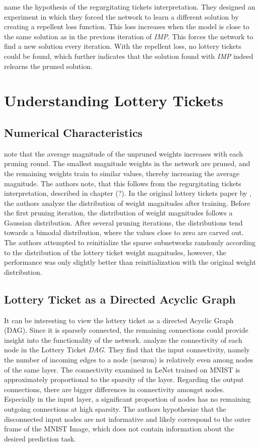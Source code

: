 \textcite{maene_towards_2021} name the hypothesis of \autocite{WhyLotteryTicketsWin} the regurgitating tickets interpretation.
They designed an experiment in which they forced the network to learn a different solution by creating a repellent loss function.
This loss increases when the model is close to the same solution as in the previous iteration of \textit{IMP}.
This forces the network to find a new solution every iteration.
With the repellent loss, no lottery tickets could be found, which further indicates that the solution found with \textit{IMP} indeed relearns the pruned solution.

\section{Understanding Lottery Tickets}
\subsection{Numerical Characteristics}
\autocite{maene_towards_2021} note that the average magnitude of the unpruned weights increases with each pruning round. The smallest magnitude weights in the network are pruned, and the remaining weights train to similar values, thereby increasing the average magnitude. The authors note, that this follows from the regurgitating tickets interpretation, described in chapter (?).
In the original lottery tickets paper by \textcite{LTH}, the authors analyze the distribution of weight magnitudes after training. Before the first pruning iteration, the distribution of weight magnitudes follows a Gaussian distribution. After several pruning iterations, the distributions tend towards a bimodal distribution, where the values close to zero are carved out.
The authors attempted to reinitialize the sparse subnetworks randomly according to the distribution of the lottery ticket weight magnitudes, however, the performance was only slightly better than reinitialization with the original weight distribution.

\subsection{Lottery Ticket as a Directed Acyclic Graph}
It can be interesting to view the lottery ticket as a directed Acyclic Graph (DAG).
Since it is sparsely connected, the remaining connections could provide insight into the functionality of the network.
\textcite{LTH} analyze the connectivity of each node in the Lottery Ticket \textit{DAG}.
They find that the input connectivity, namely the number of incoming edges to a node (neuron) is relatively even among nodes of the same layer.
The connectivity examined in LeNet trained on MNIST is approximately proportional to the sparsity of the layer.
Regarding the output connections, there are bigger differences in connectivity amongst nodes.
Especially in the input layer, a significant proportion of nodes has no remaining outgoing connections at high sparsity. 
The authors hypothesize that the disconnected input nodes are not informative and likely correspond to the outer frame of the MNIST Image, which does not contain information about the desired prediction task.

